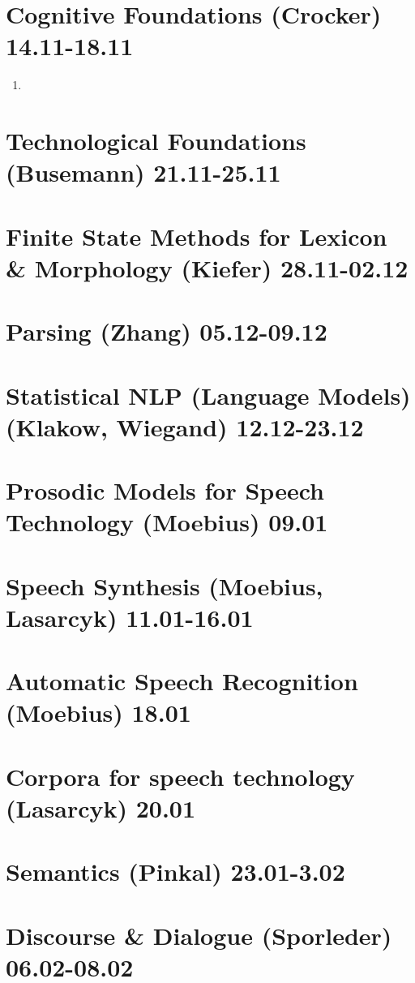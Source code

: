 \documentclass[11pt]{article}
\begin{document}
\section{ Cognitive Foundations (Crocker) 14.11-18.11}

\begin{enumerate}
 \item
\end{enumerate}


\section{Technological Foundations (Busemann) 21.11-25.11}

\section{Finite State Methods for Lexicon \& Morphology (Kiefer) 28.11-02.12}

\section{Parsing (Zhang) 05.12-09.12}

\section{Statistical NLP (Language Models) (Klakow, Wiegand) 12.12-23.12}

\section{Prosodic Models for Speech Technology (Moebius) 09.01}

\section{Speech Synthesis (Moebius, Lasarcyk) 11.01-16.01}

\section{Automatic Speech Recognition (Moebius) 18.01}

\section{Corpora for speech technology (Lasarcyk) 20.01}

\section{Semantics (Pinkal) 23.01-3.02}

\section{Discourse \& Dialogue (Sporleder) 06.02-08.02}
\end{document}

